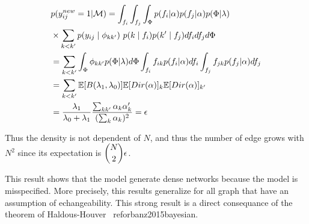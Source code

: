 
\begin{align}
&p(y_{ij}^{new}=1| \mathcal{M}) = \int_{f_i} \int_{f_j} \int_{\Phi} p(f_i| \alpha ) p(f_j| \alpha)p(\Phi| \lambda) \\
&\times \sum_{k<k'} p(y_{ij} \mid \phi_{kk'})\ p(k\mid f_i)p(k'\mid f_j)df_i df_j d\Phi \\
&=  \sum_{k<k'} \int_{\Phi} \phi_{kk'} p(\Phi| \lambda) d\Phi \int_{f_i} f_{ik} p(f_i| \alpha )df_i \int_{f_j} f_{jk}  p(f_j| \alpha ) df_j \\
&= \sum_{k<k'} \mathbb{E}[B(\lambda_1, \lambda_0)] \mathbb{E}[Dir(\mathbf{\alpha} )]_k \mathbb{E}[Dir(\mathbf{\alpha})]_{k'} \\
&= \frac{\lambda_1}{\lambda_0+\lambda_1}\frac{\sum_{kk'} \alpha_k\alpha_k'}{(\sum_k \alpha_k)^2} = \epsilon
\end{align}


Thus the density is not dependent of $N$, and thus the number of edge grows with $N^2$ since its expectation is  $\dbinom{N}{2} \epsilon$.

This result shows that the model generate dense networks because the model is misspecified. More precisely, this results generalize for all graph that have an assumption of echangeability. This strong result is a direct consequance of the theorem of Haldous-Houver \ ref{orbanz2015bayesian}. 
